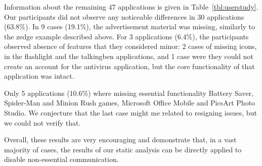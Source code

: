 \begin{table}[b]
\vspace{-0.15in}
\caption{Results of usability assessment.}
\label{tbl:userstudy}
\centering
\tabcolsep=2.5pt
\end{table}

Information about the remaining 47 applications is given in Table~\ref{tbl:userstudy}. 
Our participants did not observe any noticeable differences in 30 applications (63.8\%). 
In 9 cases (19.1\%), the advertisement material was missing, similarly to the zedge example described above. For 3 applications (6.4\%), the participants observed absence of features that they considered minor: 2 cases of missing icons, in the flashlight and the talkingben applications, and 1 case were they could not create an account for the antivirus application, but the core functionality of that application was intact. 

Only 5 applications (10.6\%) where missing essential functionality %
Battery Saver, Spider-Man and Minion Rush games, Microsoft Office Mobile and PicsArt Photo Studio. We conjecture that the last case might me related to resigning issues, but we could not verify that. 

Overall, these results are very encouraging and demonstrate that, in a vast majority of cases, the results of our static analysis can be directly applied to disable non-essential communication. 




